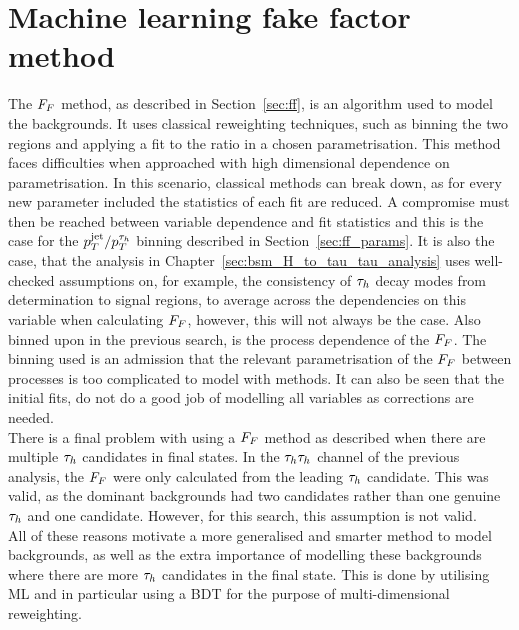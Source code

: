\section{Machine learning fake factor method}
\label{sec:ml_ff}

The $F_{F}$ method, as described in Section~\ref{sec:ff}, is an algorithm used to model the \jtth backgrounds.
It uses classical reweighting techniques, such as binning the two regions and applying a fit to the ratio in a chosen parametrisation.
This method faces difficulties when approached with high dimensional dependence on parametrisation.
In this scenario, classical  methods can break down, as for every new parameter included the statistics of each fit are reduced.
A compromise must then be reached between variable dependence and fit statistics and this is the case for the $p_{T}^{\text{jet}}/p_{T}^{\tau_{h}}$ binning described in Section~\ref{sec:ff_params}.
It is also the case, that the analysis in Chapter~\ref{sec:bsm_H_to_tau_tau_analysis} uses well-checked assumptions on, for example, the consistency of $\tau_{h}$ decay modes from determination to signal regions, to average across the dependencies on this variable when calculating $F_{F}$, however, this will not always be the case.
Also binned upon in the previous search, is the process dependence of the $F_{F}$.
The binning used is an admission that the relevant parametrisation of the $F_{F}$ between processes is too complicated to model with  methods.
It can also be seen that the initial fits, do not do a good job of modelling all variables as corrections are needed. \\

There is a final problem with using a $F_{F}$ method as described when there are multiple $\tau_{h}$ candidates in final states. 
In the $\tau_{h}\tau_{h}$ channel of the previous analysis, the $F_{F}$ were only calculated from the leading $\tau_{h}$ candidate.
This was valid, as the dominant backgrounds had two \jtth candidates rather than one genuine $\tau_{h}$ and one \jtth candidate.
However, for this search, this assumption is not valid. \\

All of these reasons motivate a more generalised and smarter method to model \jtth backgrounds, as well as the extra importance of modelling these backgrounds where there are more $\tau_{h}$ candidates in the final state.
This is done by utilising \ac{ML} and in particular using a \ac{BDT} for the purpose of multi-dimensional reweighting. \\ 

